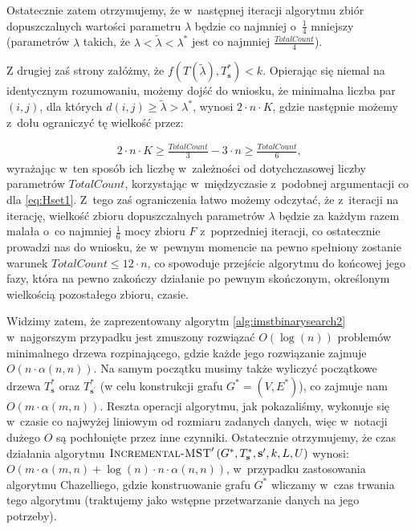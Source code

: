 Ostatecznie zatem otrzymujemy, że w~następnej iteracji algorytmu zbiór dopuszczalnych wartości parametru $\lambda$ będzie co najmniej o~$\frac{1}{4}$ mniejszy (parametrów $\lambda$ takich, że $\lambda < \tilde{\lambda} < \lambda^{\ast}$ jest co najmniej $\frac{TotalCount}{4}$).

Z drugiej zaś strony załóżmy, że $f \left( T \left( \tilde{\lambda} \right), T^{\ast}_{\textbf{s}} \right) < k$.
Opierając się niemal na identycznym rozumowaniu, możemy dojść do wniosku, że minimalna liczba par $\left( i, j \right)$, dla których $d \left( i, j \right) \geqslant \tilde{\lambda} > \lambda^{\ast}$, wynosi $2 \cdot n \cdot K$, gdzie następnie możemy z~dołu ograniczyć tę wielkość przez:

\begin{gather*}
	2 \cdot n \cdot K \geqslant \frac{TotalCount}{3} - 3 \cdot n \geqslant \frac{TotalCount}{6}\text{,}
\end{gather*}
wyrażając w~ten sposób ich liczbę w~zależności od dotychczasowej liczby parametrów $TotalCount$, korzystając w~międzyczasie z~podobnej argumentacji co dla \ref{eq:Hset1}.
Z~tego zaś ograniczenia łatwo możemy odczytać, że z~iteracji na iterację, wielkość zbioru dopuszczalnych parametrów $\lambda$ będzie za każdym razem malała o~co najmniej $\frac{1}{6}$ mocy zbioru $F$ z~poprzedniej iteracji, co ostatecznie prowadzi nas do wniosku, że w~pewnym momencie na pewno spełniony zostanie warunek $TotalCount \leqslant 12 \cdot n$, co spowoduje przejście algorytmu do końcowej jego fazy, która na pewno zakończy działanie po pewnym skończonym, określonym wielkością pozostałego zbioru, czasie.

Widzimy zatem, że zaprezentowany algorytm \ref{alg:imstbinarysearch2} w~najgorszym przypadku jest zmuszony rozwiązać $O \left( \log \left( n \right) \right)$ problemów minimalnego drzewa rozpinającego, gdzie każde jego rozwiązanie zajmuje $O \left( n \cdot \alpha \left( n, n \right) \right)$.
Na samym początku musimy także wyliczyć początkowe drzewa $T^{\ast}_{\textbf{s}}$ oraz $T^{\ast}_{\textbf{s}^{\prime}}$ (w celu konstrukcji grafu $G^{\ast} = \left( V, E^{\ast} \right)$), co zajmuje nam $O \left( m \cdot \alpha  \left( m, n \right) \right)$. 
Reszta operacji algorytmu, jak pokazaliśmy, wykonuje się w~czasie co najwyżej liniowym od rozmiaru zadanych danych, więc w~notacji dużego $O$ są pochłonięte przez inne czynniki.
Ostatecznie otrzymujemy, że czas działania algorytmu $\textsc{Incremental-MST}^{\prime} \left( G^{\ast}, T^{\ast}_{\textbf{s}}, \textbf{s}^{\prime}, k, L, U \right)$ wynosi: $O \left( m \cdot \alpha  \left( m, n \right) + \log \left( n \right) \cdot n \cdot \alpha \left( n, n \right) \right)$, w~przypadku zastosowania algorytmu Chazelliego, gdzie konstruowanie grafu $G^{\ast}$ wliczamy w~czas trwania tego algorytmu (traktujemy jako wstępne przetwarzanie danych na jego potrzeby).




